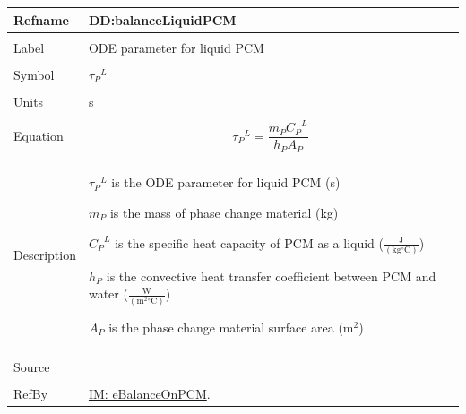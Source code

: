 \documentclass[12pt]{article}
\begin{document}
\noindent \begin{minipage}{\textwidth}
\begin{tabular}{p{} p{}}
\toprule \textbf{Refname} & \textbf{DD:balanceLiquidPCM}
\label{DD:balanceLiquidPCM}
\\ \midrule \\
Label & ODE parameter for liquid PCM
\\ \midrule \\
Symbol & ${{τ_{P}}^{L}}$
\\ \midrule \\
Units & s
\\ \midrule \\
Equation & \begin{displaymath}
           {{τ_{P}}^{L}}=\frac{{m_{P}} {{C_{P}}^{L}}}{{h_{P}} {A_{P}}}
           \end{displaymath}
\\ \midrule \\
Description & \begin{symbDescription}
              \item{${{τ_{P}}^{L}}$ is the ODE parameter for liquid PCM (s)}
              \item{${m_{P}}$ is the mass of phase change material (kg)}
              \item{${{C_{P}}^{L}}$ is the specific heat capacity of PCM as a liquid ($\frac{\text{J}}{(\text{kg}{}^{\circ}\text{C})}$)}
              \item{${h_{P}}$ is the convective heat transfer coefficient between PCM and water ($\frac{\text{W}}{(\text{m}^{2}{}^{\circ}\text{C})}$)}
              \item{${A_{P}}$ is the phase change material surface area ($\text{m}^{2}$)}
              \end{symbDescription}
\\ \midrule \\
Source & \cite{lightstone2012}
\\ \midrule \\
RefBy & \hyperref[IM:eBalanceOnPCM]{IM: eBalanceOnPCM}.
\\ \bottomrule \end{tabular}
\end{minipage}
\par~
\end{document}
